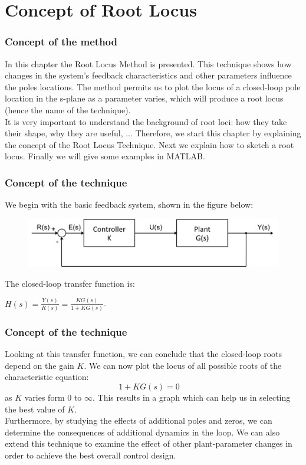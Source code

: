\section{Concept of Root Locus}

\begin{frame}
\frametitle{Concept of the method}
In this chapter the Root Locus Method is presented. This technique shows how changes in the system's feedback characteristics and other parameters influence the poles locations. The method permits us to plot the locus of a closed-loop pole location in the s-plane as a parameter varies, which will produce a root locus (hence the name of the technique).\\
\vspace{1em}
It is very important to understand the background of root loci: how they take their shape, why they are useful, ... Therefore, we start this chapter by explaining the concept of the Root Locus Technique. Next we explain how to sketch a root locus. Finally we will give some examples in MATLAB.
\end{frame}

\begin{frame}
\frametitle{Concept of the technique}
	We begin with the basic feedback system, shown in the figure below:
	\begin{figure}
		\centering
		\includegraphics[width=1\linewidth]{closed_loop_diagram}
	\end{figure}
	The closed-loop transfer function is:
	\begin{center}
		$H(s) = \frac{Y(s)}{R(s)} = \frac{KG(s)}{1 + KG(s)}$.
	\end{center}
\end{frame}

\begin{frame}
\frametitle{Concept of the technique}
	Looking at this transfer function, we can conclude that the closed-loop roots depend on the gain $K$. We can now plot the locus of all possible roots of the characteristic equation: 
	\begin{equation}
		1 + KG(s) = 0 \hspace{1em}
	\end{equation}
	as $K$ varies form $0$ to $\infty$. This results in a graph which can help us in selecting the best value of $K$.\\
	\vspace{1em}
	Furthermore, by studying the effects of additional poles and zeros, we can determine the consequences of additional dynamics in the loop. We can also extend this technique to examine the effect of other plant-parameter changes in order to achieve the best overall control design.
\end{frame}

